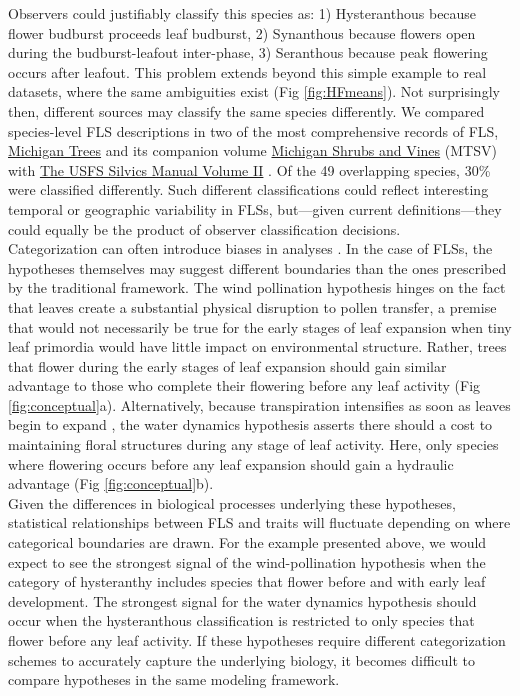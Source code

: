 \documentclass[11pt]{article}
\begin{document}
\noindent Observers could justifiably classify this species as: 1) Hysteranthous because flower budburst proceeds leaf budburst, 2) Synanthous because flowers open during the budburst-leafout inter-phase, 3) Seranthous because peak flowering occurs after leafout. This problem extends beyond this simple example to real datasets, \citep[e.g.][]{OKeefe2015} where the same ambiguities exist (Fig \ref{fig:HFmeans}). Not surprisingly then, different sources may classify the same species differently. We compared species-level FLS descriptions in two of the most comprehensive records of FLS, \underline{Michigan Trees} and its companion volume \underline{Michigan Shrubs and Vines} (MTSV) \citep{Barnes2004,Barnes2016} with \underline{The USFS Silvics Manual Volume II} \citep{Burns1990}. Of the 49 overlapping species, 30\% were classified differently. Such different classifications could reflect interesting temporal or geographic variability in FLSs, but---given current definitions---they could equally be the product of observer classification decisions.\\

\noindent Categorization can often introduce biases in analyses \citep{Royston2006}. In the case of FLSs, the hypotheses themselves may suggest different boundaries than the ones prescribed by the traditional framework. The wind pollination hypothesis hinges on the fact that leaves create a substantial physical disruption to pollen transfer, a premise that would not necessarily be true for the early stages of leaf expansion when tiny leaf primordia would have little impact on environmental structure. Rather, trees that flower during the early stages of leaf expansion should gain similar advantage to those who complete their flowering before any leaf activity (Fig \ref{fig:conceptual}a). Alternatively, because transpiration intensifies as soon as leaves begin to expand \citep{%
Wang2018}, the water dynamics hypothesis asserts there should a cost to maintaining floral structures during any stage of leaf activity. Here, only species where flowering occurs before any leaf expansion should gain a hydraulic advantage (Fig \ref{fig:conceptual}b).\\ 

\noindent Given the differences in biological processes underlying these hypotheses, statistical relationships between FLS and traits will fluctuate depending on where categorical boundaries are drawn. For the example presented above, we would expect to see the strongest signal of the wind-pollination hypothesis when the category of hysteranthy includes species that flower before and with early leaf development. The strongest signal for the water dynamics hypothesis should occur when the hysteranthous classification is restricted to only species that flower before any leaf activity. If these hypotheses require different categorization schemes to accurately capture the underlying biology, it becomes difficult to compare hypotheses in the same modeling framework.\\
\end{document}
